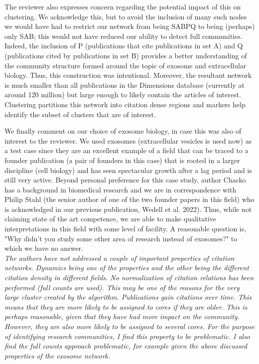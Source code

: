 \documentclass[11pt, oneside]{article}   	%
\begin{document}
The reviewer also expresses concern regarding the potential impact of this on clustering.  We acknowledge this, but to avoid the inclusion of many such nodes we would have had to restrict our network from being SABPQ to being (perhaps) only SAB; this would not have reduced our ability to detect full communities. Indeed, the inclusion of P (publications that cite publications in set A) and Q (publications cited by publications in set B) provides a better understanding of the community structure formed around the topic of exosome and extracellular biology.   Thus, this construction was intentional.
Moreover, the resultant network is  much smaller than all publications in the Dimensions database (currently at around 120 million) but 
large enough to likely contain the articles of interest. Clustering partitions this network into citation dense regions and markers help identify the subset of clusters that are of interest. 

We finally comment on our choice of exosome biology, in case this was also of interest to the reviewer. We used exosomes (extracellular vesicles is used now) as a test case since they are an excellent example of a field that can be traced to a founder publication (a pair of founders in this case) that is rooted in a larger discipline (cell biology) and has seen spectacular growth after a lag period and is still very active. Beyond personal preference for this case study, author Chacko has a background in biomedical research and we are in correspondence with Philip Stahl (the senior author of one of the two founder papers in this field) who is acknowledged in our previous publication, Wedell et al. 2022). Thus, while not claiming state of the art competence, we are able to make qualitative interpretations in this field with some level of facility.  A reasonable question is, "Why didn't you study some other area of research instead of exosomes?" to which we have no answer. \\

\emph{The authors have not addressed a couple of important properties of citation networks. Dynamics being one of the properties and the other being the different citation density in different fields. No normalization of citation relations has been performed (full counts are used). This may be one of the reasons for the very large cluster created by the algorithm. Publications gain citations over time. This means that they are more likely to be assigned to cores if they are older. This is perhaps reasonable, given that they have had more impact on the community. However, they are also more likely to be assigned to several cores. For the purpose of identifying research communities, I find this property to be problematic. I also find the full counts approach problematic, for example given the above discussed properties of the exosome network.}
\end{document}
